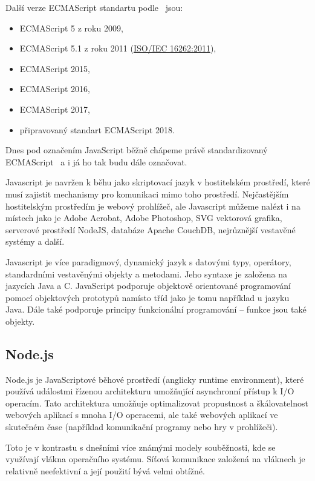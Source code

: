 Další verze ECMAScript standartu podle~\cite{mozzila:javascriptVersions} jsou:
\begin{itemize}
    \item ECMAScript 5 z roku 2009,
    \item ECMAScript 5.1 z roku 2011 (\href{http://www.iso.org/iso/iso_catalogue/catalogue_tc/catalogue_detail.htm?csnumber=55755}{ISO/IEC 16262:2011}),
    \item ECMAScript 2015,
    \item ECMAScript 2016,
    \item ECMAScript 2017,
    \item připravovaný standart ECMAScript 2018.
\end{itemize}

Dnes pod označením JavaScript běžně chápeme právě standardizovaný ECMAScript~\cite{mozzila:javascript} a i já ho tak budu dále označovat.

Javascript je navržen k běhu jako skriptovací jazyk v hostitelském prostředí, které musí zajistit mechanismy pro komunikaci mimo toho prostředí.
Nejčastějším hostitelským prostředím je webový prohlížeč, ale Javascript můžeme nalézt i na místech jako je Adobe Acrobat, Adobe Photoshop, SVG vektorová grafika, serverové prostředí NodeJS, databáze Apache CouchDB, nejrůznější vestavěné systémy a další.~\cite{mozzila:javascript}

Javascript je více paradigmový, dynamický jazyk s datovými typy, operátory, standardními vestavěnými objekty a metodami.
Jeho syntaxe je založena na jazycích Java a C.
JavaScript podporuje objektově orientované programování pomocí objektových prototypů namísto tříd jako je tomu například u jazyku Java.
Dále také podporuje principy funkcionální programování -- funkce jsou také objekty.~\cite{mozzila:javascript}

\subsection{Node.js}\label{subsec:nodejs}

Node.js je JavaScriptové běhové prostředí (anglicky runtime environment), které používá událostmi řízenou architekturu umožňující asynchronní přístup k \gls{I/O} operacím.
Tato architektura umožňuje optimalizovat propustnost a škálovatelnost webových aplikací s mnoha \gls{I/O} operacemi, ale také webových aplikací ve skutečném čase (například komunikační programy nebo hry v prohlížeči).~\cite{node:article2013}

Toto je v kontrastu s dnešními více známými modely souběžnosti, kde se využívají vlákna operačního systému.
Síťová komunikace založená na vláknech je relativně neefektivní a její použití bývá velmi obtížné.~\cite{node:about}

